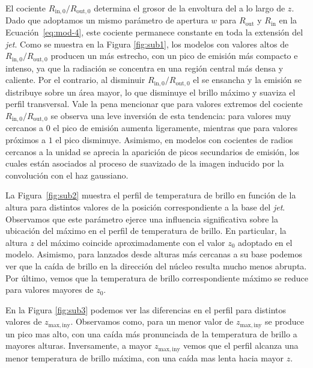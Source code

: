 	El cociente $R_\mathrm{in,0}/R_\mathrm{out,0}$ determina el grosor de la envoltura del \jet a lo largo de $z$.
	Dado que adoptamos un mismo parámetro de apertura $w$ para $R_\mathrm{out}$ y $R_\mathrm{in}$ en la Ecuación~\eqref{eq:mod-4}, este cociente permanece constante en toda la extensión del \textit{jet}.
	Como se muestra en la Figura \ref{fig:sub1}, los modelos con valores altos de $R_\mathrm{in,0}/R_\mathrm{out,0}$ producen un \jet más estrecho, con un pico de emisión más compacto e intenso, ya que la radiación se concentra en una región central más densa y caliente.
	Por el contrario, al disminuir $R_\mathrm{in,0}/R_\mathrm{out,0}$ el \jet se ensancha y la emisión se distribuye sobre un área mayor, lo que disminuye el brillo máximo y suaviza el perfil transversal.
	Vale la pena mencionar que para valores extremos del cociente $R_\mathrm{in,0}/R_\mathrm{out,0}$ se observa una leve inversión de esta tendencia: para valores muy cercanos a $0$ el pico de emisión aumenta ligeramente, mientras que para valores próximos a $1$ el pico disminuye.
	Asimismo, en modelos con cocientes de radios cercanos a la unidad se aprecia la aparición de picos secundarios de emisión, los cuales están asociados al proceso de suavizado de la imagen inducido por la convolución con el haz gaussiano.

	La Figura~\ref{fig:sub2} muestra el perfil de temperatura de brillo en función de la altura para distintos valores de la posición correspondiente a la base del \textit{jet}.
	Observamos que este parámetro ejerce una influencia significativa sobre la ubicación del máximo en el perfil de temperatura de brillo.
	En particular, la altura $z$ del máximo coincide aproximadamente con el valor $z_0$ adoptado en el modelo.
	Asimismo, para \jets lanzados desde alturas m\'as cercanas a su base podemos ver que la caída de brillo en la dirección del núcleo resulta mucho menos abrupta. Por último, vemos que la temperatura de brillo correspondiente máximo se reduce para valores mayores de $z_0$.

	En la Figura \ref{fig:sub3} podemos ver las diferencias en el perfil para distintos valores de $z_\mathrm{max,iny}$.
	Observamos como, para un menor valor de $z_\mathrm{max,iny}$ se produce un pico mas alto, con una caída más pronunciada de la temperatura de brillo a mayores alturas.
	Inversamente, a mayor $z_\mathrm{max,iny}$ vemos que el perfil alcanza una menor temperatura de brillo máxima, con una caída mas lenta hacia mayor $z$.

